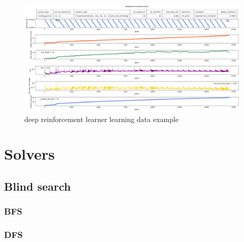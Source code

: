 \begin{landscape}
\centering\vspace*{\fill}
\begin{figure}[H]
\centering
\includegraphics[scale=0.55]{./Figures/exampledeepreinforcementlearnerlearning}
\caption[Examples]{deep reinforcement learner learning data example}
\label{fig:exampledeepreinforcementlearnerlearning}
\end{figure}
\vfill
\end{landscape}
\restoregeometry






\section{Solvers}

\subsection{Blind search}
\subsubsection{BFS}
\label{BFSSS}
\subsubsection{DFS}
\label{DFSSS}



